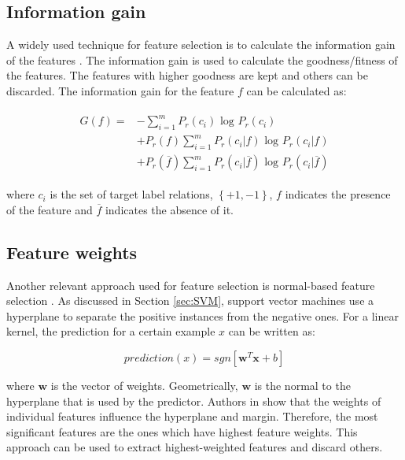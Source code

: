 \subsection{Information gain}\label{subsec:IG}

A widely used technique for feature selection is to calculate the information gain of the features \cite{yang1997comparative}. The information gain is used to calculate the goodness/fitness of the features. The features with higher goodness are kept and others can be discarded. The information gain for the feature $f$ can be calculated as:

\begin{align}
\begin{aligned}
 G \left( f \right) = & -  \sum^m_{i=1} P_r(c_i) \text{ log } P_r(c_i) \\
  & + P_r(f) \sum^m_{i=1} P_r(c_i|f) \text{ log } P_r(c_i|f)\\
  & +  P_r(\overline{f}) \sum^m_{i=1} P_r(c_i|\overline{f}) \text{ log } P_r(c_i|\overline{f})
\end{aligned}
\end{align}

where $c_i$ is the set of target label relations, $\left\lbrace +1, -1 \right\rbrace$, $f$ indicates the presence of the feature and $\overline{f}$ indicates the absence of it.

\subsection{Feature weights}\label{subsec:FWR}

Another relevant approach used for feature selection is normal-based feature selection \cite{brank2002feature}. As discussed in Section \ref{sec:SVM}, support vector machines use a hyperplane to separate the positive instances from the negative ones. For a linear kernel, the prediction for a certain example $x$ can be written as:

$$
prediction(x) = sgn \left[ \mathbf{w}^T\mathbf{x} + b \right]
$$

where $\mathbf{w}$ is the vector of weights. Geometrically, $\mathbf{w}$ is the normal to the hyperplane that is used by the predictor. Authors in \cite{brank2002feature} show that the weights of individual features influence the hyperplane and margin. Therefore, the most significant features are the ones which have highest feature weights. This approach can be used to extract highest-weighted features and discard others.

